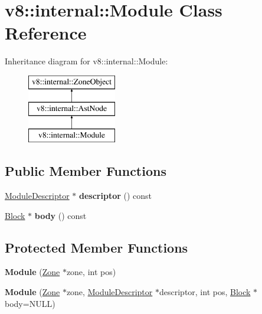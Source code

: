 \hypertarget{classv8_1_1internal_1_1_module}{}\section{v8\+:\+:internal\+:\+:Module Class Reference}
\label{classv8_1_1internal_1_1_module}
Inheritance diagram for v8\+:\+:internal\+:\+:Module\+:\begin{figure}[H]
\begin{center}
\leavevmode
\includegraphics[height=3.000000cm]{classv8_1_1internal_1_1_module}
\end{center}
\end{figure}
\subsection*{Public Member Functions}
\begin{DoxyCompactItemize}
\item 
\hyperlink{classv8_1_1internal_1_1_module_descriptor}{Module\+Descriptor} $\ast$ {\bfseries descriptor} () const \hypertarget{classv8_1_1internal_1_1_module_ab6a9da7c531474d769eac80c71281473}{}\label{classv8_1_1internal_1_1_module_ab6a9da7c531474d769eac80c71281473}

\item 
\hyperlink{classv8_1_1internal_1_1_block}{Block} $\ast$ {\bfseries body} () const \hypertarget{classv8_1_1internal_1_1_module_a4e18d4a3e438da920c667e37e698698c}{}\label{classv8_1_1internal_1_1_module_a4e18d4a3e438da920c667e37e698698c}

\end{DoxyCompactItemize}
\subsection*{Protected Member Functions}
\begin{DoxyCompactItemize}
\item 
{\bfseries Module} (\hyperlink{classv8_1_1internal_1_1_zone}{Zone} $\ast$zone, int pos)\hypertarget{classv8_1_1internal_1_1_module_a6e3c0c186b1d8b877ff9bc59ecdb6bc0}{}\label{classv8_1_1internal_1_1_module_a6e3c0c186b1d8b877ff9bc59ecdb6bc0}

\item 
{\bfseries Module} (\hyperlink{classv8_1_1internal_1_1_zone}{Zone} $\ast$zone, \hyperlink{classv8_1_1internal_1_1_module_descriptor}{Module\+Descriptor} $\ast$descriptor, int pos, \hyperlink{classv8_1_1internal_1_1_block}{Block} $\ast$body=N\+U\+LL)\hypertarget{classv8_1_1internal_1_1_module_aaf97f770d030a8895628469797631545}{}\label{classv8_1_1internal_1_1_module_aaf97f770d030a8895628469797631545}

\end{DoxyCompactItemize}
